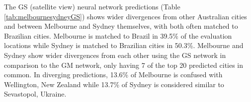 \documentclass[Crown,sageh,times]{sagej}
\begin{document}
\begin{table}[!htbp]
\begin{tabular}{ l l l l l}
\hline
\end{tabular}
\end{table}

The GS (satellite view) neural network predictions (Table \ref{tab:melbournesydneyGS}) shows wider divergences from other Australian cities and between Melbourne and Sydney themselves, with both often matched to Brazilian cities. Melbourne is matched to Brazil in 39.5\% of the evaluation locations while Sydney is matched to Brazilian cities in 50.3\%. Melbourne and Sydney show wider divergences from each other using the GS network in comparison to the GM network, only having 7 of the top 20 predicted cities in common. In diverging predictions, 13.6\% of Melbourne is confused with Wellington, New Zealand while 13.7\% of Sydney is considered similar to Sevastopol, Ukraine. 
\end{document}
